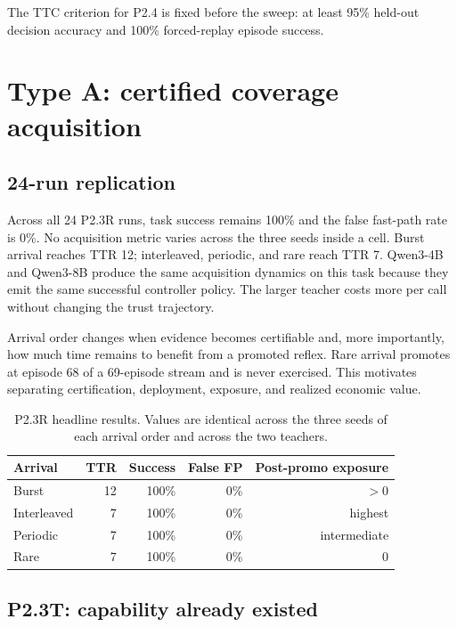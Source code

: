 \documentclass[10pt]{article}
\begin{document}
The TTC criterion for P2.4 is fixed before the sweep: at least 95\% held-out decision accuracy and 100\% forced-replay episode success.

\section{Type A: certified coverage acquisition}

\subsection{24-run replication}

Across all 24 P2.3R runs, task success remains 100\% and the false fast-path rate is 0\%. No acquisition metric varies across the three seeds inside a cell. Burst arrival reaches TTR 12; interleaved, periodic, and rare reach TTR 7. Qwen3-4B and Qwen3-8B produce the same acquisition dynamics on this task because they emit the same successful controller policy. The larger teacher costs more per call without changing the trust trajectory.

Arrival order changes when evidence becomes certifiable and, more importantly, how much time remains to benefit from a promoted reflex. Rare arrival promotes at episode 68 of a 69-episode stream and is never exercised. This motivates separating certification, deployment, exposure, and realized economic value.

\begin{table}[t]
\centering
\caption{P2.3R headline results. Values are identical across the three seeds of each arrival order and across the two teachers.}
\label{tab:p23r}
\begin{tabular}{lrrrr}
\toprule
Arrival & TTR & Success & False FP & Post-promo exposure \\
\midrule
Burst & 12 & 100\% & 0\% & $>$0 \\
Interleaved & 7 & 100\% & 0\% & highest \\
Periodic & 7 & 100\% & 0\% & intermediate \\
Rare & 7 & 100\% & 0\% & 0 \\
\bottomrule
\end{tabular}
\end{table}

\subsection{P2.3T: capability already existed}
\end{document}
